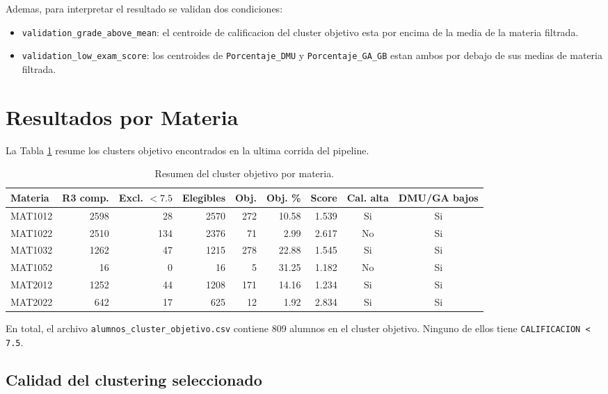 \documentclass[11pt,letterpaper]{article}
\newcommand{\code}[1]{\texttt{#1}}
\newcommand{\yes}{Si}
\newcommand{\no}{No}
\begin{document}
Ademas, para interpretar el resultado se validan dos condiciones:

\begin{itemize}
    \item \code{validation\_grade\_above\_mean}: el centroide de calificacion del cluster objetivo esta por encima de la media de la materia filtrada.
    \item \code{validation\_low\_exam\_score}: los centroides de \code{Porcentaje\_DMU} y \code{Porcentaje\_GA\_GB} estan ambos por debajo de sus medias de materia filtrada.
\end{itemize}

\section{Resultados por Materia}

La Tabla \ref{tab:resumen-materias} resume los clusters objetivo encontrados en la ultima corrida del pipeline.

\begin{table}[H]
\centering
\small
\caption{Resumen del cluster objetivo por materia.}
\label{tab:resumen-materias}
\begin{tabular}{lrrrrrrcc}
\toprule
Materia & R3 comp. & Excl. $<7.5$ & Elegibles & Obj. & Obj. \% & Score & Cal. alta & DMU/GA bajos \\
\midrule
MAT1012 & 2598 & 28  & 2570 & 272 & 10.58 & 1.539 & \yes & \yes \\
MAT1022 & 2510 & 134 & 2376 & 71  & 2.99  & 2.617 & \no  & \yes \\
MAT1032 & 1262 & 47  & 1215 & 278 & 22.88 & 1.545 & \yes & \yes \\
MAT1052 & 16   & 0   & 16   & 5   & 31.25 & 1.182 & \no  & \yes \\
MAT2012 & 1252 & 44  & 1208 & 171 & 14.16 & 1.234 & \yes & \yes \\
MAT2022 & 642  & 17  & 625  & 12  & 1.92  & 2.834 & \yes & \yes \\
\bottomrule
\end{tabular}
\end{table}

En total, el archivo \code{alumnos\_cluster\_objetivo.csv} contiene 809 alumnos en el cluster objetivo. Ninguno de ellos tiene \code{CALIFICACION < 7.5}.

\subsection{Calidad del clustering seleccionado}
\end{document}
